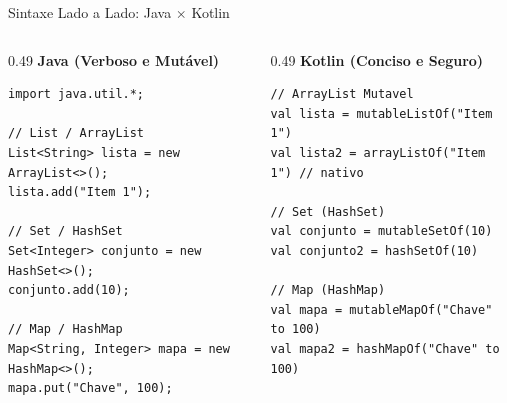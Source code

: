 \documentclass[aspectratio=169]{beamer}
\begin{document}
\begin{frame}[fragile]{Sintaxe Lado a Lado: Java $\times$ Kotlin}
  \begin{columns}[T]
    \begin{column}{0.49\textwidth}
      {\footnotesize\textcolor{kotlinorange}{\textbf{Java (Verboso e Mutável)}}}
\begin{lstlisting}[style=JavaStyle]
import java.util.*;

// List / ArrayList
List<String> lista = new ArrayList<>();
lista.add("Item 1");

// Set / HashSet
Set<Integer> conjunto = new HashSet<>();
conjunto.add(10);

// Map / HashMap
Map<String, Integer> mapa = new HashMap<>();
mapa.put("Chave", 100);
\end{lstlisting}
    \end{column}

    \begin{column}{0.49\textwidth}
      {\footnotesize\textcolor{kotlinpurple}{\textbf{Kotlin (Conciso e Seguro)}}}
\begin{lstlisting}[style=KotlinStyle]
// ArrayList Mutavel
val lista = mutableListOf("Item 1")
val lista2 = arrayListOf("Item 1") // nativo

// Set (HashSet)
val conjunto = mutableSetOf(10)
val conjunto2 = hashSetOf(10)

// Map (HashMap)
val mapa = mutableMapOf("Chave" to 100)
val mapa2 = hashMapOf("Chave" to 100)
\end{lstlisting}
    \end{column}
  \end{columns}
\end{frame}
\end{document}
